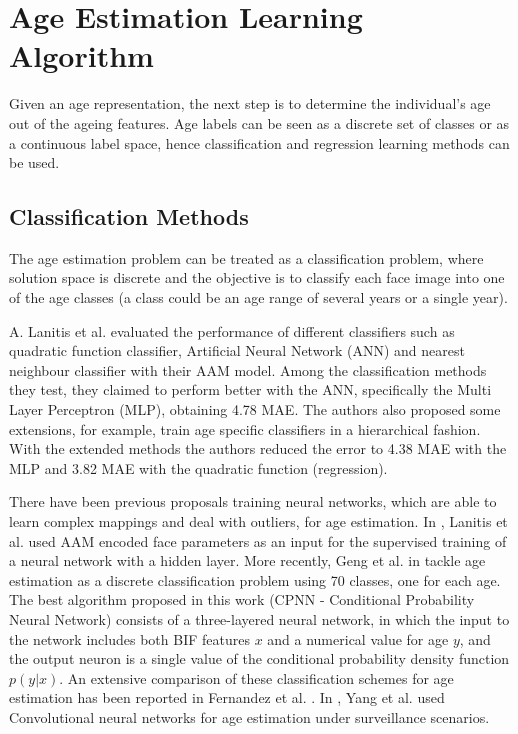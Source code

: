 \section{Age Estimation Learning Algorithm}
Given an age representation, the next step is to determine the individual's age out of the ageing features. Age labels can be seen as a discrete set of classes or as a continuous label space, hence classification and regression learning methods can be used.

\subsection{Classification Methods}

The age estimation problem can be treated as a classification problem, where solution space is discrete and the objective is to classify each face image into one of the age classes (a class could be an age range of several years or a single year).

A. Lanitis et al. \cite{Lanitis:2004:CDC:2225304.2226166} evaluated the performance of different classifiers such as quadratic function classifier, Artificial Neural Network (ANN) and nearest neighbour classifier with their AAM model. Among the classification methods they test, they claimed to perform better with the ANN, specifically the Multi Layer Perceptron (MLP), obtaining 4.78 MAE. The authors also proposed some extensions, for example, train age specific classifiers in a hierarchical fashion. With the extended methods the authors reduced the error to 4.38 MAE with the MLP and 3.82 MAE with the quadratic function (regression).

There have been previous proposals training neural networks,
which are able to learn complex mappings and deal with
outliers, for age estimation. In \cite{Lanitis:2004:CDC:2225304.2226166}, Lanitis et al. used AAM encoded face parameters as an input for the supervised training
of a neural network with a hidden layer. More recently, Geng
et al. in \cite{6475129} tackle age estimation as a discrete classification problem using 70 classes, one for each age. The best algorithm proposed in this work (CPNN - Conditional Probability Neural Network) consists of a three-layered neural network, in which the input to the network includes both BIF features $x$ and a numerical value for age $y$, and the output neuron is a single value of the conditional probability density function $p(y|x)$. An extensive comparison of these classification schemes for age estimation has been reported in Fernandez et al. \cite{2014icprw}. In \cite{5995481}, Yang et al. used Convolutional neural networks for age estimation under surveillance scenarios.

